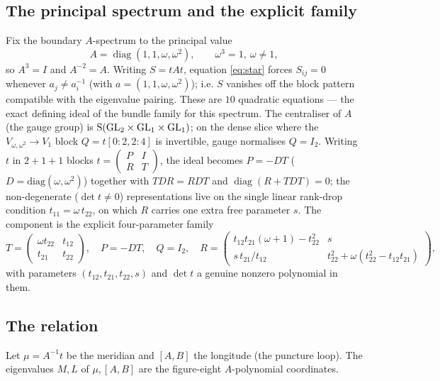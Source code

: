 \subsection{The principal spectrum and the explicit family} Fix the boundary $A$-spectrum to the
principal value
\begin{equation}
  A=\operatorname{diag}(1,1,\omega,\omega^2),\qquad \omega^3=1,\ \omega\neq1,
\end{equation}
so $A^3=I$ and $A^{-2}=A$. Writing $S=tAt$, equation \eqref{eq:star} forces $S_{ij}=0$ whenever
$a_j\neq a_i^{-1}$ (with $a=(1,1,\omega,\omega^2)$); i.e. $S$ vanishes off the block pattern compatible
with the eigenvalue pairing. These are $10$ quadratic equations --- the exact defining ideal of the
bundle family for this spectrum. The centraliser of $A$ (the gauge group) is
$\mathrm{S}(\mathrm{GL}_2\times\mathrm{GL}_1\times\mathrm{GL}_1)$; on the dense slice where the $V_{\omega,\omega^2}\!\to V_1$
block $Q=t[0{:}2,2{:}4]$ is invertible, gauge normalises $Q=I_2$. Writing $t$ in $2{+}1{+}1$ blocks
$t=\left(\begin{smallmatrix}P&I\\R&T\end{smallmatrix}\right)$, the ideal becomes $P=-DT$ ($D=\mathrm{diag}(\omega,\omega^2)$)
together with $TDR=RDT$ and $\operatorname{diag}(R+TDT)=0$; the non-degenerate ($\det t\neq0$)
representations live on the single linear rank-drop condition $t_{11}=\omega\,t_{22}$, on which $R$
carries one extra free parameter $s$. The component is the explicit four-parameter family
\begin{equation}\label{eq:family}
  T=\begin{pmatrix}\omega t_{22}&t_{12}\\ t_{21}&t_{22}\end{pmatrix},\quad P=-DT,\quad Q=I_2,\quad
  R=\begin{pmatrix} t_{12}t_{21}(\omega{+}1)-t_{22}^2 & s\\[2pt] s\,t_{21}/t_{12} & t_{22}^2+\omega(t_{22}^2-t_{12}t_{21})\end{pmatrix},
\end{equation}
with parameters $(t_{12},t_{21},t_{22},s)$ and $\det t$ a genuine nonzero polynomial in them.

\subsection{The relation} Let $\mu=A^{-1}t$ be the meridian and $[A,B]$ the longitude (the puncture
loop). The eigenvalues $M,L$ of $\mu,[A,B]$ are the figure-eight $A$-polynomial coordinates.

